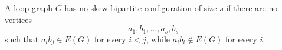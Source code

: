 \begin{definition}
A loop graph \(G\) has no skew bipartite configuration of size \(s\) if there are no vertices
\[
  a_1,b_1,\ldots,a_s,b_s
\]
such that \(a_i b_j\in E(G)\) for every \(i<j\), while \(a_i b_i\notin E(G)\) for every \(i\).
\end{definition}
